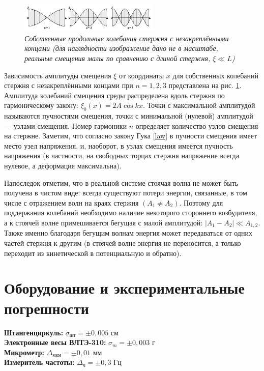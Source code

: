 \documentclass[a4paper,12pt]{article}
\begin{document}
\begin{figure}[h!]
        \centering
	\includegraphics[width=0.6\textwidth]{waves.png}
	\caption{\textit{Собственные продольные колебания стержня с незакреплёнными концами (для наглядности изображение дано не в масштабе, реальные смещения малы по сравнению с длиной стержня, $\xi \ll L$)}}
	\label{waves}
\end{figure}

Зависимость амплитуды смещения $\xi$ от координаты $x$ для собственных колебаний стержня с незакреплёнными концами при $n = 1,2,3$ представлена на рис. \ref{waves}. Амплитуда колебаний смещения среды распределена вдоль стержня по гармоническому закону: $\xi_0 (x) = 2A \cos{kx}$. Точки с максимальной амплитудой называются пучностями смещения, точки с минимальной (нулевой) амплитудой — узлами смещения. Номер гармоники $n$ определяет количество узлов смещения на стержне. Заметим, что согласно закону Гука \eqref{law} в пучности смещения имеет место узел напряжения, и, наоборот, в узлах смещения имеется пучность напряжения (в частности, на свободных торцах стержня напряжение всегда нулевое, а деформация максимальна).

Напоследок отметим, что в реальной системе стоячая волна не может быть получена в чистом виде: всегда существуют потери энергии, связанные, в том числе с отражением волн на краях стержня $(A_1 \neq A_2)$. Поэтому для поддержания колебаний необходимо наличие некоторого стороннего возбудителя, а к стоячей волне примешивается бегущая с малой амплитудой: $\left | A_1 - A_2 \right | \ll A_{1,2}$. Также именно благодаря бегущим волнам энергия может передаваться от одних частей стержня к другим (в стоячей волне энергия не переносится, а только переходит из кинетической в потенциальную и обратно).

\section{Оборудование и экспериментальные погрешности}

\textbf{Штангенциркуль:} $\sigma_\text{шт} = \pm 0,005$ см \\
\textbf{Электронные весы ВЛТЭ-310:} $\sigma_m = \pm 0,003$ г \\
\textbf{Микрометр:} $\Delta_\text{мкм} = \pm 0,01 $ мм \\
\textbf{Измеритель частоты:} $\Delta_\text{ч} = \pm 0,3 $ Гц \\
\end{document}
